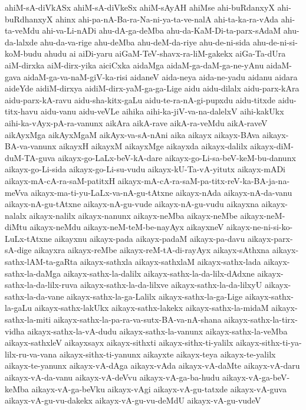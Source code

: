 {ahiM-sA-diVkASx
ahiM-sA-diVkeSx
ahiM-sAyAH
ahiMse
ahi-buRdanxyX
ahi-buRdhanxyX
ahinx
ahi-pa-nA-Ba-ra-Na-ni-ya-ta-ve-nalA
ahi-ta-ka-ra-vAda
ahi-ta-veMdu
ahi-va-Li-nADi
ahu-dA-ga-deMba
ahu-da-KaM-Di-ta-parx-sAdaM
ahu-da-lalxde
ahu-da-va-rige
ahu-deMba
ahu-deM-da-riye
ahu-de-ni-sida
ahu-de-ni-si-koM-budu
ahudu
ai
aiDi-yaru
aiGaM-TeV-shavx-ra-liM-gakekx
aiGa-Ta-dUra
aiM-dirxka
aiM-dirx-yika
aiciCxka
aidaMga
aidaM-ga-daM-ga-ne-yAnu
aidaM-gava
aidaM-ga-va-naM-giV-ka-risi
aidaneV
aida-neya
aida-ne-yadu
aidanu
aidara
aideYde
aidiM-dirxya
aidiM-dirx-yaM-ga-ga-Lige
aidu
aidu-dilalx
aidu-parx-kAra
aidu-parx-kA-ravu
aidu-sha-kitx-gaLu
aidu-te-ra-nA-gi-pupxdu
aidu-titxde
aidu-titx-havu
aidu-vanu
aidu-veVLe
aihika
aihi-ka-jiV-va-na-dalelxV
aihi-kakUkx
aihi-ka-vAyx-pA-ra-vanunx
aikAra
aikA-rave
aikA-ra-veMdu
aikA-raveV
aikAyxMga
aikAyxMgaM
aikAyx-va-sA-nAni
aika
aikayx
aikayx-BAva
aikayx-BA-va-vanunx
aikayxH
aikayxM
aikayxMge
aikayxda
aikayx-dalilx
aikayx-diM-duM-TA-guva
aikayx-go-LaLx-beV-kA-dare
aikayx-go-Li-sa-beV-keM-bu-danunx
aikayx-go-Li-sida
aikayx-go-Li-su-vudu
aikayx-kU-Ta-vA-yitutx
aikayx-mADi
aikayx-mA-cA-ra-saM-patitxH
aikayx-mA-cA-ra-saM-pa-titx-reV-ka-BA-ja-na-meVva
aikayx-ma-ti-yu-LaLx-va-nA-gu-tAtxne
aikayx-nAda
aikayx-nA-da-vanu
aikayx-nA-gu-tAtxne
aikayx-nA-gu-vude
aikayx-nA-gu-vudu
aikayxna
aikayx-nalalx
aikayx-nalilx
aikayx-nanunx
aikayx-neMba
aikayx-neMbe
aikayx-neM-diMtu
aikayx-neMdu
aikayx-neM-teM-be-nayAyx
aikayxneV
aikayx-ne-ni-si-ko-LuLx-tAtxne
aikayxnu
aikayx-pada
aikayx-padaM
aikayx-pa-davu
aikayx-parx-sA-dige
aikayxra
aikayx-reMbe
aikayx-reM-tA-di-rayAyx
aikayx-sAthxna
aikayx-sathx-lAM-ta-gaRta
aikayx-sathxla
aikayx-sathxlaM
aikayx-sathx-lada
aikayx-sathx-la-daMga
aikayx-sathx-la-dalilx
aikayx-sathx-la-da-lilx-dAdxne
aikayx-sathx-la-da-lilx-ruva
aikayx-sathx-la-da-lilxve
aikayx-sathx-la-da-lilxyU
aikayx-sathx-la-da-vane
aikayx-sathx-la-ga-Lalilx
aikayx-sathx-la-ga-Lige
aikayx-sathx-la-gaLu
aikayx-sathx-lakUkx
aikayx-sathx-lakekx
aikayx-sathx-la-midaM
aikayx-sathx-la-miti
aikayx-sathx-la-pa-ra-va-sutx-BA-va-nA-shana
aikayx-sathx-la-tirx-vidha
aikayx-sathx-la-vA-dudu
aikayx-sathx-la-vanunx
aikayx-sathx-la-veMba
aikayx-sathxleV
aikayxsayx
aikayx-sithxti
aikayx-sithx-ti-yalilx
aikayx-sithx-ti-ya-lilx-ru-va-vana
aikayx-sithx-ti-yanunx
aikayxte
aikayx-teya
aikayx-te-yalilx
aikayx-te-yanunx
aikayx-vA-dAga
aikayx-vAda
aikayx-vA-daMte
aikayx-vA-daru
aikayx-vA-da-vanu
aikayx-vA-deVvu
aikayx-vA-ga-ba-hudu
aikayx-vA-ga-beV-keMba
aikayx-vA-ga-beVku
aikayx-vAgi
aikayx-vA-gu-tatxde
aikayx-vA-guva
aikayx-vA-gu-vu-dakekx
aikayx-vA-gu-vu-deMdU
aikayx-vA-gu-vudeV
}
